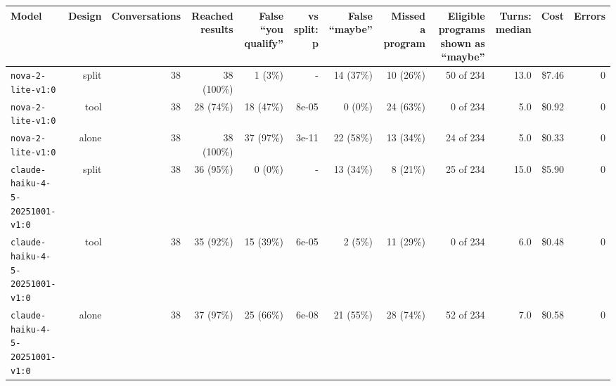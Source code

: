 \begin{tabular}{lrrrrrrrrrrr}
\toprule
Model & Design & Conversations & Reached results & False ``you qualify'' & vs split: p & False ``maybe'' & Missed a program & Eligible programs shown as ``maybe'' & Turns: median & Cost & Errors \\
\midrule
\texttt{nova-2-lite-v1:0} & split & 38 & 38 (100\%) & 1 (3\%) & - & 14 (37\%) & 10 (26\%) & 50 of 234 & 13.0 & \$7.46 & 0 \\
\texttt{nova-2-lite-v1:0} & tool & 38 & 28 (74\%) & 18 (47\%) & 8e-05 & 0 (0\%) & 24 (63\%) & 0 of 234 & 5.0 & \$0.92 & 0 \\
\texttt{nova-2-lite-v1:0} & alone & 38 & 38 (100\%) & 37 (97\%) & 3e-11 & 22 (58\%) & 13 (34\%) & 24 of 234 & 5.0 & \$0.33 & 0 \\
\texttt{claude-haiku-4-5-20251001-v1:0} & split & 38 & 36 (95\%) & 0 (0\%) & - & 13 (34\%) & 8 (21\%) & 25 of 234 & 15.0 & \$5.90 & 0 \\
\texttt{claude-haiku-4-5-20251001-v1:0} & tool & 38 & 35 (92\%) & 15 (39\%) & 6e-05 & 2 (5\%) & 11 (29\%) & 0 of 234 & 6.0 & \$0.48 & 0 \\
\texttt{claude-haiku-4-5-20251001-v1:0} & alone & 38 & 37 (97\%) & 25 (66\%) & 6e-08 & 21 (55\%) & 28 (74\%) & 52 of 234 & 7.0 & \$0.58 & 0 \\
\bottomrule
\end{tabular}
